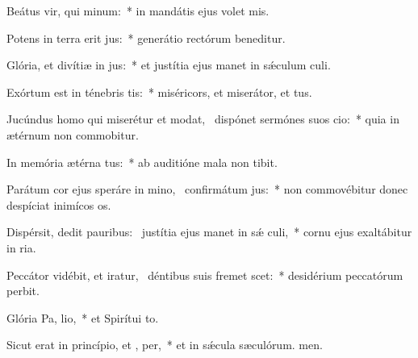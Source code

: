 \item Beátus vir, qui  minum:~* in mandátis ejus volet mis.
\item Potens in terra erit  jus:~* generátio rectórum beneditur.
\item Glória, et divítiæ in  jus:~* et justítia ejus manet in sǽculum culi.
\item Exórtum est in ténebris  tis:~* miséricors, et miserátor, et tus.
\item Jucúndus homo qui miserétur et modat,~\pscross{} dispónet sermónes suos  cio:~* quia in ætérnum non commobitur.
\item In memória ætérna  tus:~* ab auditióne mala non tibit.
\item Parátum cor ejus speráre in mino,~\pscross{} confirmátum   jus:~* non commovébitur donec despíciat inimícos os.
\item Dispérsit, dedit pauribus:~\pscross{} justítia ejus manet in sǽ culi,~* cornu ejus exaltábitur in ria.
\item Peccátor vidébit, et iratur,~\pscross{} déntibus suis fremet  scet:~* desidérium peccatórum perbit.
\item Glória Pa,  lio,~* et Spirítui to.
\item Sicut erat in princípio, et ,  per,~* et in sǽcula sæculórum. men.
